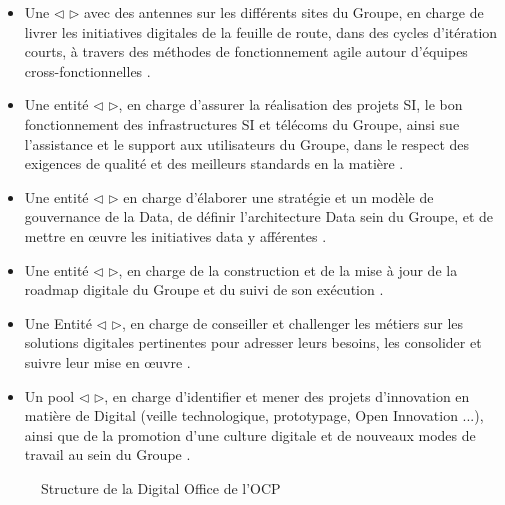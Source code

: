 \begin{itemize}
\item Une ${\triangleleft}$ {\color{orange}{Digital Factory}} ${\triangleright}$ avec des antennes sur les diff\'erents sites du Groupe, en charge de livrer les initiatives digitales de la feuille de route, dans des cycles d'it\'eration courts, \`a travers des m\'ethodes de fonctionnement agile autour d'\'equipes cross-fonctionnelles .
\item Une entit\'e ${\triangleleft}$ {\color{orange}{Syst\`emes d'Information}} ${\triangleright}$, en charge d'assurer la r\'ealisation des projets SI, le bon fonctionnement des infrastructures SI et t\'el\'ecoms du Groupe, ainsi sue l'assistance et le support aux utilisateurs du Groupe, dans le respect des exigences de qualit\'e et des meilleurs standards en la mati\`ere .
\item Une entit\'e ${\triangleleft}$ {\color{orange}{Data Management}} ${\triangleright}$ en charge d'\'elaborer une strat\'egie et un mod\`ele de gouvernance de la Data, de d\'efinir l'architecture Data sein du Groupe, et de mettre en \oe uvre les initiatives data y aff\'erentes .
\item Une entit\'e ${\triangleleft}$ {\color{orange}{Data Planning \& PMO}} ${\triangleright}$, en charge de la construction et de la mise \`a jour de la roadmap digitale du Groupe et du suivi de son ex\'ecution .
\item Une Entit\'e ${\triangleleft}$ {\color{orange}{Business Architecture}} ${\triangleright}$, en charge de conseiller et challenger les m\'etiers sur les solutions digitales pertinentes pour adresser leurs besoins, les consolider et suivre leur mise en \oe uvre .
\item Un pool ${\triangleleft}$ {\color{orange}{Digital Innovation \& Change Officers}} ${\triangleright}$, en charge d'identifier et mener des projets d'innovation en mati\`ere de Digital (veille technologique, prototypage, Open Innovation ...), ainsi que de la promotion d'une culture digitale et de nouveaux modes de travail au sein du Groupe .
\end{itemize}

\begin{figure}[!htb]
	\caption{\label{fig:my-label} Structure de la Digital Office de l'OCP}
\end{figure}

